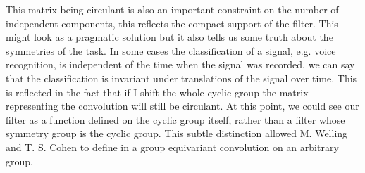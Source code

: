 \documentclass[../3.tex]{subfiles}
\begin{document}
    This matrix being circulant is also an important constraint on the number of independent components, this reflects the compact support of the filter.
    This might look as a pragmatic solution but it also tells us some truth about the symmetries of the task.
    In some cases the classification of a signal, e.g. voice recognition, is independent of the time when the signal was recorded,
    we can say that the classification is invariant under translations of the signal over time. This is reflected in the fact that if I 
    shift the whole cyclic group the matrix representing the convolution will still be circulant.
    At this point, we could see our filter as a function defined on the cyclic group itself, rather than a filter whose symmetry group is the cyclic group.
    This subtle distinction allowed M. Welling and T. S. Cohen to define in \cite{gcnn} a group equivariant convolution on an arbitrary group.
    
\end{document}
